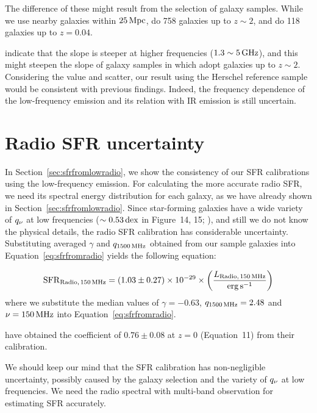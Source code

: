 The difference of these might result from the selection of galaxy samples.
While we use nearby galaxies within $25\,\mathrm{Mpc}$, \citet{CalistroRivera2017a} do 758 galaxies up to $z\sim2$, and \citet{Chyzy2018} do 118 galaxies up to $z=0.04$.

\citet{Chyzy2018} indicate that the slope is steeper at higher frequencies ($1.3 \sim 5\,\mathrm{GHz}$), and this might steepen the slope of galaxy samples in \citet{CalistroRivera2017a} which adopt galaxies up to $z\sim2$.
Considering the value and scatter, our result using the Herschel reference sample would be consistent with previous findings.
Indeed, the frequency dependence of the low-frequency emission and its relation with IR emission is still uncertain.



\section{Radio SFR uncertainty}\label{sec:radiosfruncertainty}

In Section~\ref{sec:sfrfromlowradio}, we show the consistency of our SFR calibrations using the low-frequency emission.
For calculating the more accurate radio SFR, we need its spectral energy distribution for each galaxy, as we have already shown in Section~\ref{sec:sfrfromlowradio}.
Since star-forming galaxies have a wide variety of $q_{\nu}$ at low frequencies ($\sim 0.53\,\mathrm{dex}$ in Figure~14, 15; \citealt{CalistroRivera2017a}), and still we do not know the physical details, the radio SFR calibration has considerable uncertainty.
Substituting averaged $\gamma$ and $q_{\mathrm{1500\,\mathrm{MHz}}}$ obtained from our sample galaxies into Equation~\ref{eq:sfrfromradio} yields the following equation:

\begin{equation}\label{eq:sfrradio_calibration}
    \mathrm{SFR}_{\mathrm{Radio},\,150\,\mathrm{MHz}} = \left(1.03\pm0.27\right) \times 10^{-29} \times \left(\frac{L_{\mathrm{Radio},\,150\,\mathrm{MHz}}}{\mathrm{erg}\,\mathrm{s}^{-1}}\right)
\end{equation}
where we substitute the median values of $\gamma=-0.63$, $q_{\mathrm{1500\,\mathrm{MHz}}}=2.48$ and $\nu=150\,\mathrm{MHz}$ into Equation~\ref{eq:sfrfromradio}.

\citet{CalistroRivera2017a} have obtained the coefficient of $0.76 \pm 0.08$ at $z = 0$ (Equation~11) from their calibration.

We should keep our mind that the SFR calibration has non-negligible uncertainty, possibly caused by the galaxy selection and the variety of $q_{\nu}$ at low frequencies.
We need the radio spectral with multi-band observation for estimating SFR accurately.



